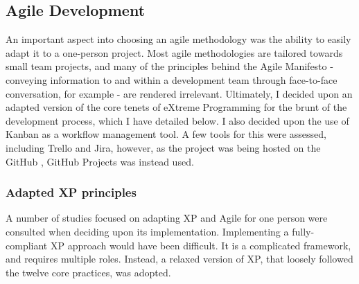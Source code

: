 \subsection{Agile Development}

An important aspect into choosing an agile methodology was the ability to easily adapt it to a one-person project. Most agile methodologies are tailored towards small team projects, and many of the principles behind the Agile Manifesto - conveying information to and within a development team through face-to-face conversation, for example - are rendered irrelevant. Ultimately, I decided upon an adapted version of the core tenets of eXtreme Programming for the brunt of the development process, which I have detailed below. I also decided upon the use of Kanban as a workflow management tool. A few tools for this were assessed, including Trello and Jira, however, as the project was being hosted on the GitHub , GitHub Projects was instead used. 

\subsubsection{Adapted XP principles}

A number of studies focused on adapting XP and Agile for one person were consulted when deciding upon its implementation. Implementing a fully-compliant XP approach would have been difficult. It is a complicated framework, and requires multiple roles. Instead, a relaxed version of XP, that loosely followed the twelve core practices, was adopted.

